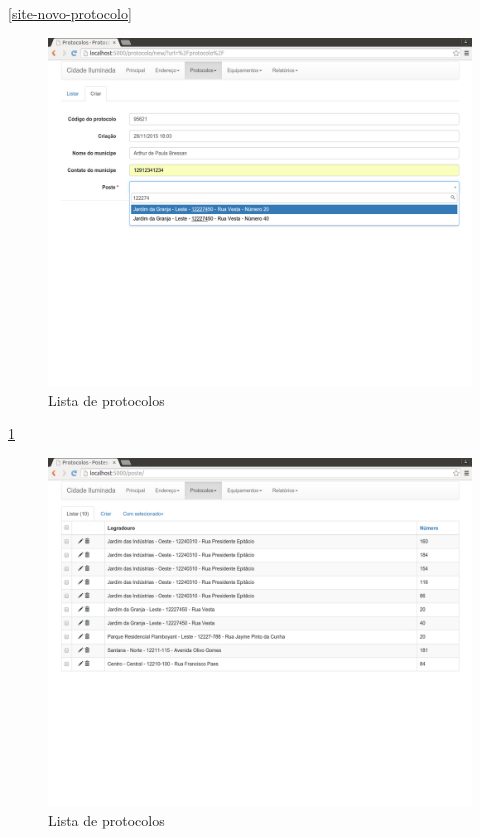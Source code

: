 \documentclass[
	article,			%
	11pt,				%
	oneside,			%
	a4paper,			%
	english,			%
	brazil,				%
	sumario=tradicional
	]{abntex2}
\begin{document}
\ref{site-novo-protocolo}

\begin{figure}[!htbp]
 \centering
 \caption{\label{site-seleciona-poste}Lista de protocolos}
 \includegraphics[scale=0.25]{site/3-seleciona_poste.png}
\end{figure}

\ref{site-seleciona-poste}
\clearpage

\begin{figure}[!htbp]
 \centering
 \caption{\label{site-lista-poste}Lista de protocolos}
 \includegraphics[scale=0.25]{site/4-lista_postes.png}
\end{figure}
\end{document}
